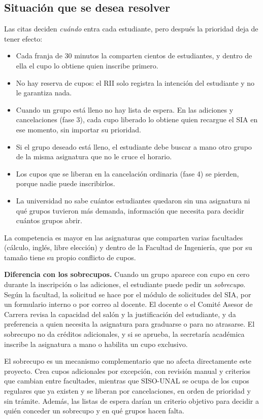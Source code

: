 \documentclass[conference]{IEEEtran}
\begin{document}
\subsection{Situación que se desea resolver}
Las citas deciden \emph{cuándo} entra cada estudiante, pero después la prioridad deja de tener efecto:
\begin{itemize}
    \item Cada franja de 30 minutos la comparten cientos de estudiantes, y dentro de ella el cupo lo obtiene quien inscribe primero.
    \item No hay reserva de cupos: el RII solo registra la intención del estudiante y no le garantiza nada.
    \item Cuando un grupo está lleno no hay lista de espera. En las adiciones y cancelaciones (fase 3), cada cupo liberado lo obtiene quien recargue el SIA en ese momento, sin importar su prioridad.
    \item Si el grupo deseado está lleno, el estudiante debe buscar a mano otro grupo de la misma asignatura que no le cruce el horario.
    \item Los cupos que se liberan en la cancelación ordinaria (fase 4) se pierden, porque nadie puede inscribirlos.
    \item La universidad no sabe cuántos estudiantes quedaron sin una asignatura ni qué grupos tuvieron más demanda, información que necesita para decidir cuántos grupos abrir.
\end{itemize}
La competencia es mayor en las asignaturas que comparten varias facultades (cálculo, inglés, libre elección) y dentro de la Facultad de Ingeniería, que por su tamaño tiene su propio conflicto de cupos.

\textbf{Diferencia con los sobrecupos.} Cuando un grupo aparece con cupo en cero durante la inscripción o las adiciones, el estudiante puede pedir un \emph{sobrecupo}. Según la facultad, la solicitud se hace por el módulo de solicitudes del SIA, por un formulario interno o por correo al docente. El docente o el Comité Asesor de Carrera revisa la capacidad del salón y la justificación del estudiante, y da preferencia a quien necesita la asignatura para graduarse o para no atrasarse. El sobrecupo no da créditos adicionales, y si se aprueba, la secretaría académica inscribe la asignatura a mano o habilita un cupo exclusivo.

El sobrecupo es un mecanismo complementario que no afecta directamente este proyecto. Crea cupos adicionales por excepción, con revisión manual y criterios que cambian entre facultades, mientras que SISO-UNAL se ocupa de los cupos regulares que ya existen y se liberan por cancelaciones, en orden de prioridad y sin trámite. Además, las listas de espera darían un criterio objetivo para decidir a quién conceder un sobrecupo y en qué grupos hacen falta.
\end{document}
